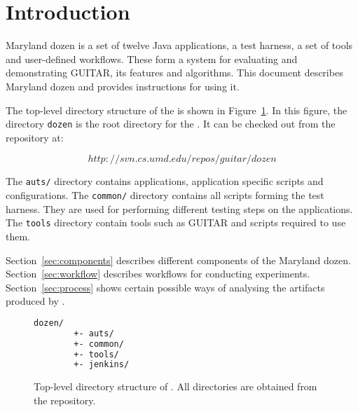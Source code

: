 

\section{Introduction}
\label{sec:introduction}

Maryland dozen is a set of twelve Java applications, a test harness, a set of tools and user-defined workflows. These form a system for evaluating and demonstrating GUITAR, its features and algorithms. This document describes Maryland dozen and provides instructions for using it.

The top-level directory structure of the \mddozen{} is shown in Figure~\ref{fig:dozenlayout}. In this figure, the directory \texttt{dozen} is the root directory for the \mddozen{}. It can be checked out from the repository at:

\begin{center}
\begin{equation}
http://svn.cs.umd.edu/repos/guitar/dozen
\end{equation}
\end{center}

The \texttt{auts/} directory contains applications, application specific scripts and configurations. The \texttt{common/} directory contains all scripts forming the test harness. They are used for performing different testing steps on the applications. The \texttt{tools} directory contain tools such as GUITAR and scripts required to use them.

Section~\ref{sec:components} describes different components of the Maryland dozen. Section~\ref{sec:workflow} describes workflows for conducting experiments. Section~\ref{sec:process} shows certain possible ways of analysing the artifacts produced by \mddozen{}.

\begin{figure}
\scriptsize{
   \begin{lstlisting}[language=sh, showstringspaces=false, breaklines=true]
      dozen/
        +- auts/
        +- common/
        +- tools/
        +- jenkins/
   \end{lstlisting}
}
   \caption{Top-level directory structure of \mddozen{}. All directories are obtained from the repository.}
   \label{fig:dozenlayout}
\end{figure}



